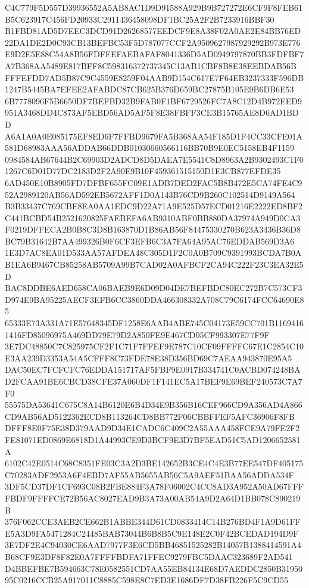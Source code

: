 \documentclass[UTF8,fontset=fandol,zihao=-4,a4paper]{ctexart}
\begin{document}
{{C4C779F5D557D39936552A5AB8AC1D9D91588A929B9B727272E6CF9F8FEB61B5C623917C456FD20933C2911436458098DF1BC25A2F2B7233916BBF30
B1FBD81AD5D7EEC3DCD91D26268577EEDCF9E8A38F02A0AE2E84BB76ED22DA1DE2D0C93CB13BEFBC53F5D787077CCF2A9509627987929292B973E776
E9D2E5E88C54A8B56FDFFEFAEBAFAF8041336D5AD0949797870BB3FDFBF7A7B368AA5489E817BFF8C598316372737345C13AB1CBF8B8E38EEBDAB56B
FFFEFDD7AD5B87C9C4559E8259F04AAB9D154C617E7F64EB3237333F596DB1247B5445BA7EFEE2AFABDC87CB625B376D659BC27875B105E9B6DB6E53
6B7778096F5B6650DF7BEFBD32B9FAB0F1BF6729526FC7A8C12D4B972EED9951A3468DD4C873AF5EBD56AD5AF5F8E38FBFF3CE3B15765AE8D6AD1BDD
A6A1A0A0E085175EF8ED6F7FFBD9679FA5B368AA54F185D1F4CC33CFE01A581D68983AAA56ADDAB66DDB01030660566116BB70B9E0EC5158EB4F1159
0984584AB67644B2C69903D2ADCD8D5DAEA7E5541C8D8963A2B9302493C1F01267C6D01D77DC2183D2F2A90E9B10F459361515150D1E3CB877EFDE35
6AD450E10B8905FD7DFBF655FC09E1ADB7DED2FAC5B8B472E5CA74FE4C952A2989120AB56AD592EB5672AFF1D0A143B76CD9B260C102514D9149A564
B3B33437C769CBE8EA0AA1EDC9D22A71A9E525D57ECD01216E2222ED8BF2C441BCBD54B2521620825FAEBEFA6AB9310ABF0BB880DA37974A949D0CA3
F0219DFFECA2B0B8C3D8B163870D1B86AB56F84475330270B623A3436B36D8BC79B31642B7AA499326B0F6CF3EFB6C3A7FA64A95AC76EDDAB569D3A6
1E3D7AC8EA01D533AA57AFDEA48C305D1F2C0A0B709C9391993BCDA7B0AB1EA6B9467CB85258AB5709A99B7CAD02A0AFBCF2CA94C222F23C3EA32E5D
BAC8DDBE6AED658CA06BAEB9E6D09D04DE7BEFBDC80EC272B7C573CF3D974E9BA95225AECF3EFB6CC3860DDA466308332A708C79C6174FCC64690E85
65333E73A331A71E57648345DF1258E6AAB4ABE745C04173E59CC701B11694161416FD85096975A469DD79E79D2A850FE9E467CD05CF993307E77F9F
3E7DC48850C7C825975CF2F1C71F7FFEF9E787C10CF09FFFFC67E1C2854C10E3AA239D3353A54A5CFFF8C73FDE78E38D356BD69C7AEAA943870E95A5
DAC50EC7FCFCFC76EDDA151717AF5FBF9E0917B334741C0ACBD074248BAD2FCAA91BE6CBCD38CFE37A060DF1F141EC5A17BEF9E69BEF240573C7A7F0
55575DA53641C675C8A14B6120E6B4D34E9B356B16CEF966CD9A356AD4A866CD9AB56AD5122362ECD8B113264CD8BB772F06CBBFFEF5AFC36906F8FB
DFFF8E0F75E38D379AAD9D34E1CADC6C409C2A55AAA458FCE9A79FE2F2FE81071ED0869E6818D1A44993CE9D3BCF9E3D7BF5EAD51C5AD1206652581A
6102C42E0514C68C8351FE03C3A2D3BE142652B3CE4C4E3B77EE547DF405175C70283ADF2953A6F4EBD7AF55AB5655AB56C5A9AEF51BAA56ADDA534F
3DF5CD37DF1CF693C08B2FBE884F3A78F06002C4CC8AD3A952A50AD67FFFFBDF9FFFFCE72B56AC8027EAD9B3A73A00AB54A9D2A64D1BB078C890219B
376F062CCE3AEB2CE662B1ABBE344D61CD0833414C14B276BD4F1A9D61FFE5A3D9FA5471284C24485BAB73044B6B8B5C9E148E2C0F42BCEDAD194D9F
3E7DF2E4C94030CE6AAD7977F3E6CD5BB46851525282B14057B1388414591A4B68CF9E3DF8F82E0A7FFFFBDFA71FFEC9279FBC5DAAC323689F2AD541
D4BBEFBE7B594663C78E0582551CD7AA55EB84134E68D7AEDDC2850B3195095C0216CCB25A917011C8885C598E8C7ED3E1686DF7D38FB226F5C9CD55
}}
\end{document}
